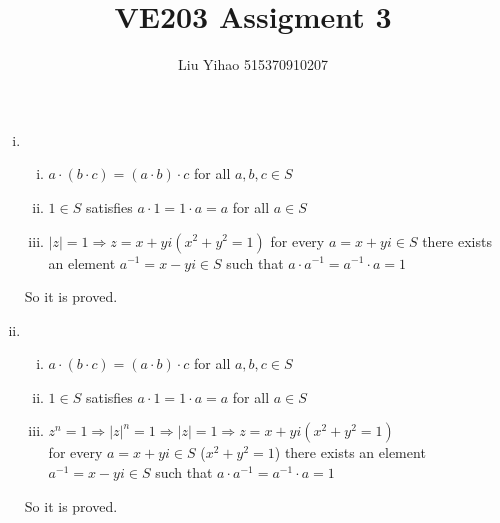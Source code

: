 \documentclass{article}
\title{VE203 Assigment 3}
\author{Liu Yihao 515370910207}
\date{}
\begin{document}
\maketitle

\section{}
\begin{enumerate}[i)]
\item
\begin{enumerate}[(i)]
\item
$a\cdot(b\cdot c)=(a\cdot b)\cdot c$ for all $a,b,c\in S$
\item
$1\in S$ satisfies $a\cdot1=1\cdot a=a$ for all $a\in S$
\item
$|z|=1\Rightarrow z=x+yi(x^2+y^2=1)$
for every $a=x+yi\in S$ there exists an element $a^{-1}=x-yi\in S$ such that $a\cdot a^{-1}=a^{-1}\cdot a=1$
\end{enumerate}
So it is proved.

\item
\begin{enumerate}[(i)]
\item
$a\cdot(b\cdot c)=(a\cdot b)\cdot c$ for all $a,b,c\in S$
\item
$1\in S$ satisfies $a\cdot1=1\cdot a=a$ for all $a\in S$
\item
$z^n=1\Rightarrow|z|^n=1\Rightarrow|z|=1\Rightarrow z=x+yi(x^2+y^2=1)$\\
for every $a=x+yi\in S$ ($x^2+y^2=1$) there exists an element $a^{-1}=x-yi\in S$ such that $a\cdot a^{-1}=a^{-1}\cdot a=1$
\end{enumerate}
So it is proved.
\end{enumerate}
\end{document}

